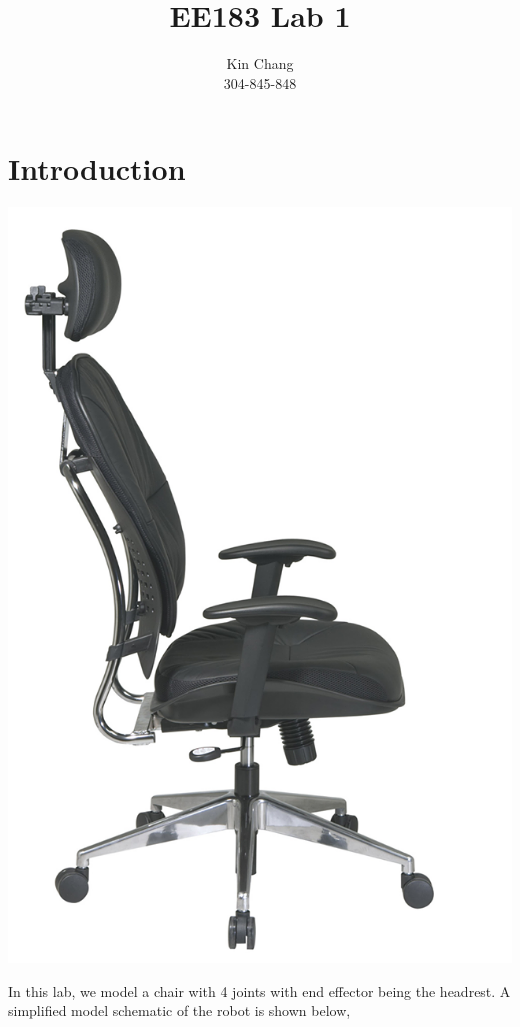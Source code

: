 \documentclass[12pt, letterpaper]{amsart} %
\author{Kin Chang \\ 304-845-848}
\title{EE183 Lab 1}
\numberwithin{equation}{section}
\begin{document}
\maketitle
\section{Introduction}
\begin{center}
\includegraphics[scale=0.5]{1}  
\end{center}
In this lab, we model a chair with 4 joints with end effector being the headrest. A simplified model schematic of the robot is shown below,
\end{document}

